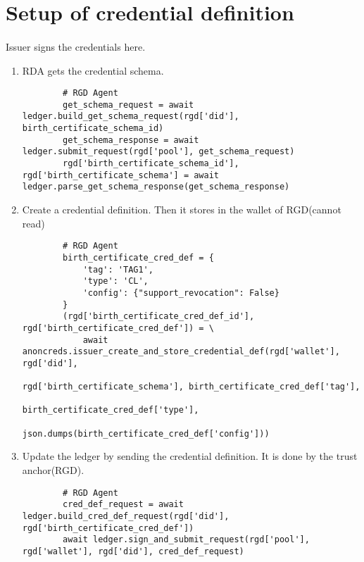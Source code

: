 \section{Setup of credential definition}

\paragraph{}
Issuer signs the credentials here.

\begin{enumerate}
    \item RDA gets the credential schema.
    \begin{verbatim}
        # RGD Agent
        get_schema_request = await ledger.build_get_schema_request(rgd['did'], birth_certificate_schema_id)
        get_schema_response = await ledger.submit_request(rgd['pool'], get_schema_request) 
        rgd['birth_certificate_schema_id'], rgd['birth_certificate_schema'] = await ledger.parse_get_schema_response(get_schema_response)
    \end{verbatim}

    \item Create a credential definition. Then it stores in the wallet of RGD(cannot read)
    \begin{verbatim}
        # RGD Agent
        birth_certificate_cred_def = {
            'tag': 'TAG1',
            'type': 'CL',
            'config': {"support_revocation": False}
        }
        (rgd['birth_certificate_cred_def_id'], rgd['birth_certificate_cred_def']) = \
            await anoncreds.issuer_create_and_store_credential_def(rgd['wallet'], rgd['did'],
                                                                rgd['birth_certificate_schema'], birth_certificate_cred_def['tag'],
                                                                birth_certificate_cred_def['type'],
                                                                json.dumps(birth_certificate_cred_def['config']))
    \end{verbatim}

    \item Update the ledger by sending the credential definition. It is done by the trust anchor(RGD).
    \begin{verbatim}
        # RGD Agent     
        cred_def_request = await ledger.build_cred_def_request(rgd['did'], rgd['birth_certificate_cred_def'])
        await ledger.sign_and_submit_request(rgd['pool'], rgd['wallet'], rgd['did'], cred_def_request)
    \end{verbatim}
\end{enumerate}

